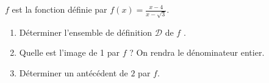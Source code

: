 
$f$ est la fonction définie par $f(x)= \frac{x-4}{x - \sqrt{3}}$.
\begin{enumerate}
\item Déterminer l'ensemble de définition $\mathscr{D}$ de $f$ .
\item Quelle est l'image de 1 par $f$ ? On rendra le dénominateur entier.
\item Déterminer un antécédent de $2$ par $f$.
\end{enumerate}